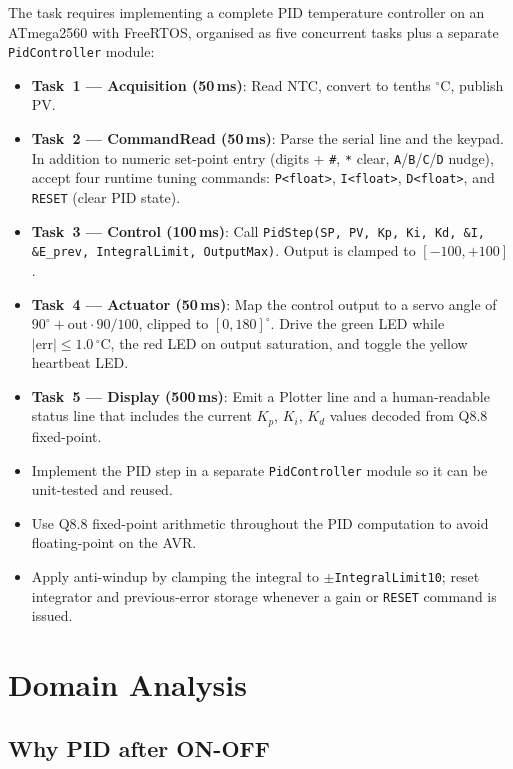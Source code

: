 \documentclass[12pt]{article}
\begin{document}
The task requires implementing a complete PID temperature controller on an ATmega2560 with FreeRTOS, organised as five concurrent tasks plus a separate \texttt{PidController} module:
\begin{itemize}
  \item \textbf{Task~1 --- Acquisition (50\,ms)}: Read NTC, convert to tenths $^{\circ}$C, publish PV.
  \item \textbf{Task~2 --- CommandRead (50\,ms)}: Parse the serial line and the keypad. In addition to numeric set-point entry (digits + \texttt{\#}, \texttt{*} clear, \texttt{A}/\texttt{B}/\texttt{C}/\texttt{D} nudge), accept four runtime tuning commands: \texttt{P<float>}, \texttt{I<float>}, \texttt{D<float>}, and \texttt{RESET} (clear PID state).
  \item \textbf{Task~3 --- Control (100\,ms)}: Call \texttt{PidStep(SP, PV, Kp, Ki, Kd, \&I, \&E\_prev, IntegralLimit, OutputMax)}. Output is clamped to $[-100, +100]$.
  \item \textbf{Task~4 --- Actuator (50\,ms)}: Map the control output to a servo angle of $90^{\circ} + \mathrm{out}\cdot 90/100$, clipped to $[0, 180]^{\circ}$. Drive the green LED while $|\mathrm{err}| \le 1.0\,^{\circ}$C, the red LED on output saturation, and toggle the yellow heartbeat LED.
  \item \textbf{Task~5 --- Display (500\,ms)}: Emit a Plotter line and a human-readable status line that includes the current $K_p$, $K_i$, $K_d$ values decoded from Q8.8 fixed-point.
  \item Implement the PID step in a separate \texttt{PidController} module so it can be unit-tested and reused.
  \item Use Q8.8 fixed-point arithmetic throughout the PID computation to avoid floating-point on the AVR.
  \item Apply anti-windup by clamping the integral to $\pm$\texttt{IntegralLimit10}; reset integrator and previous-error storage whenever a gain or \texttt{RESET} command is issued.
\end{itemize}

\section{Domain Analysis}

\subsection{Why PID after ON-OFF}
\end{document}
